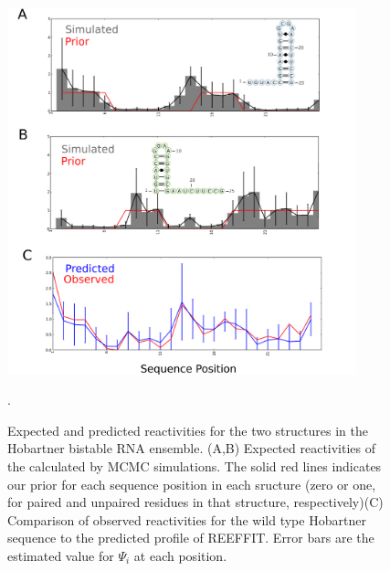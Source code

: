 \documentclass[12pt]{article}
\begin{document}
\begin{figure}[here]
\includegraphics[width=0.9\textwidth]{figures/hobartnerpredicted.png}
\caption{Expected and predicted reactivities for the two structures in the Hobartner bistable RNA ensemble. (A,B) Expected reactivities of the calculated by MCMC simulations. The solid red lines indicates our prior for each sequence position in each sructure (zero or one, for paired and unpaired residues in that structure, respectively)(C)  Comparison of observed reactivities for the wild type Hobartner sequence to the predicted profile of REEFFIT. Error bars are the estimated value for $\Psi_i$ at each position.}.
\label{fig:hobartnerpredictedfig}
\end{figure}
\end{document}

